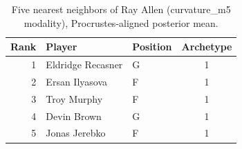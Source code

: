\begin{table}[htbp]
  \centering\small
  \begin{tabular}{rllc}
    \toprule
    Rank & Player & Position & Archetype \\
    \midrule
    1 & Eldridge Recasner & G & 1 \\
    2 & Ersan Ilyasova & F & 1 \\
    3 & Troy Murphy & F & 1 \\
    4 & Devin Brown & G & 1 \\
    5 & Jonas Jerebko & F & 1 \\
    \bottomrule
  \end{tabular}
  \caption{Five nearest neighbors of Ray Allen (curvature_m5 modality), Procrustes-aligned posterior mean.}
  \label{tab:Ray_Allen_neighbors_curvature_m5}
\end{table}

